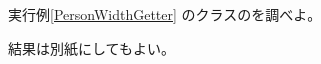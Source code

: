 \begin{Prob}\upshape
 実行例\else\ref{PersonWidthGetter}\fi
 のクラスのを調べよ。
\end{Prob}
\ifText 結果は別紙にしてもよい。\vspace{0.15\textheight}\fi